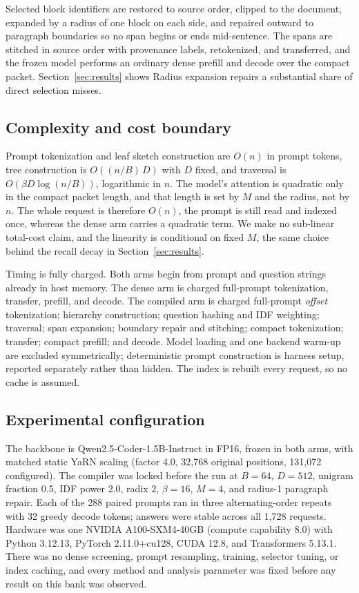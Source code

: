 \documentclass[conference]{IEEEtran}
\begin{document}
Selected block identifiers are restored to source order, clipped to the document,
expanded by a radius of one block on each side, and repaired outward to paragraph
boundaries so no span begins or ends mid-sentence. The spans are stitched in source
order with provenance labels, retokenized, and transferred, and the frozen model
performs an ordinary dense prefill and decode over the compact packet. Section~\ref{sec:results} shows Radius expansion repairs a substantial
share of direct selection misses.

\subsection{Complexity and cost boundary}

Prompt tokenization and leaf sketch construction are $O(n)$ in prompt tokens, tree
construction is $O((n/B)\,D)$ with $D$ fixed, and traversal is
$O(\beta D\log(n/B))$, logarithmic in $n$. The model's attention is quadratic only in
the compact packet length, and that length is set by $M$ and the radius, not by $n$.
The whole request is therefore $O(n)$, the prompt is still read and indexed once,
whereas the dense arm carries a quadratic term. We make no sub-linear total-cost claim,
and the linearity is conditional on fixed $M$, the same choice behind the recall decay
in Section~\ref{sec:results}.

Timing is fully charged. Both arms begin from prompt and question strings already in
host memory. The dense arm is charged full-prompt tokenization, transfer, prefill,
and decode. The compiled arm is charged full-prompt \emph{offset} tokenization;
hierarchy construction; question hashing and IDF weighting; traversal; span
expansion; boundary repair and stitching; compact tokenization; transfer; compact
prefill; and decode. Model loading and one backend warm-up are excluded
symmetrically; deterministic prompt construction is harness setup, reported
separately rather than hidden. The index is rebuilt every request, so no cache is
assumed.

\subsection{Experimental configuration}

The backbone is Qwen2.5-Coder-1.5B-Instruct \cite{qwen} in FP16, frozen in both arms,
with matched static YaRN \cite{yarn} scaling (factor 4.0, 32,768 original positions,
131,072 configured). The compiler was locked before the run at $B=64$, $D=512$,
unigram fraction 0.5, IDF power 2.0, radix 2, $\beta=16$, $M=4$, and radius-1
paragraph repair. Each of the 288 paired prompts ran in three alternating-order
repeats with 32 greedy decode tokens; answers were stable across all 1,728 requests. Hardware was one NVIDIA A100-SXM4-40GB (compute capability
8.0) with Python 3.12.13, PyTorch 2.11.0+cu128, CUDA 12.8, and Transformers 5.13.1.
There was no dense screening, prompt resampling, training, selector tuning, or index
caching, and every method and analysis parameter was fixed before any result on this
bank was observed.
\end{document}
